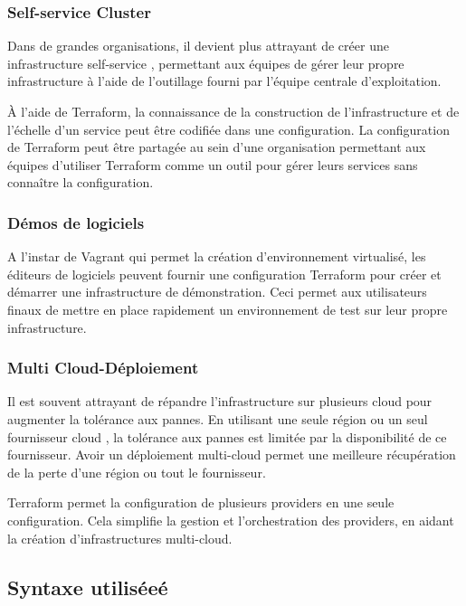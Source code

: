 \documentclass[]{article}
\begin{document}
\subsubsection{Self-service Cluster}\label{self-service-cluster}

Dans de grandes organisations, il devient plus attrayant de créer une
infrastructure \og self-service \fg,
permettant aux équipes de gérer leur propre infrastructure à l'aide de
l'outillage fourni par l'équipe centrale d'exploitation.

À l'aide de Terraform, la connaissance de la construction de
l'infrastructure et de l'échelle d'un service peut être codifiée dans
une configuration. La configuration de Terraform peut être partagée au
sein d'une organisation permettant aux équipes d'utiliser Terraform
comme un outil pour gérer leurs services sans connaître la
configuration.

\subsubsection{Démos de logiciels}\label{duxe9mos-de-logiciels}

A l'instar de Vagrant qui permet la création d'environnement virtualisé,
les éditeurs de logiciels peuvent fournir une configuration Terraform
pour créer et démarrer une infrastructure de démonstration. Ceci permet
aux utilisateurs finaux de mettre en place rapidement un environnement
de test sur leur propre infrastructure.

\subsubsection{Multi
Cloud-Déploiement}\label{multi-cloud-duxe9ploiement}

Il est souvent attrayant de répandre l'infrastructure sur plusieurs
cloud pour augmenter la tolérance aux pannes. En utilisant une seule
région ou un seul fournisseur cloud , la tolérance aux pannes est
limitée par la disponibilité de ce fournisseur. Avoir un déploiement
multi-cloud permet une meilleure récupération de la perte d'une région
ou tout le fournisseur.

Terraform permet la configuration de plusieurs providers en une seule
configuration. Cela simplifie la gestion et l'orchestration des
providers, en aidant la création d'infrastructures multi-cloud.

\subsection{Syntaxe utiliséeé}\label{syntaxe-utilisuxe9}
\end{document}
